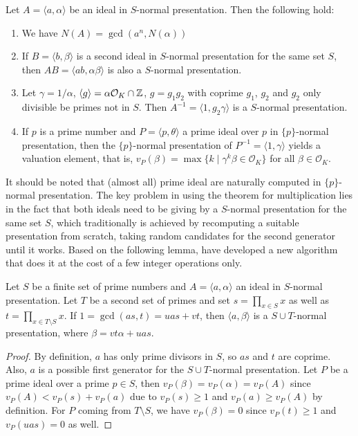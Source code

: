 \documentclass{sig-alternate-05-2015}
\begin{document}
\begin{theorem}
Let $A = \langle a, \alpha \rangle$ be an ideal in $S$-normal presentation. Then the following hold:
\begin{enumerate}
\item We have $N(A) = \gcd(a^n, N(\alpha))$
\item If $B = \langle b, \beta\rangle$ is a second ideal in $S$-normal
presentation for the same set $S$, then
$AB = \langle ab, \alpha\beta\rangle$ is also a $S$-normal presentation.
\item Let $\gamma = 1/\alpha$, $\langle g\rangle = \alpha \mathcal O_K \cap \mathbb{Z}$,
 $g = g_1g_2$ with coprime $g_1$, $g_2$ and $g_2$ only divisible be primes not in $S$. Then $A^{-1} = \langle 1, g_2\gamma\rangle$ is a $S$-normal presentation.
\item If $p$ is a prime number and $P= \langle p, \theta\rangle$ a prime ideal over $p$
in $\{p\}$-normal presentation, then the $\{p\}$-normal presentation
of $P^{-1} = \langle 1, \gamma\rangle$ yields a valuation element, that is,
$v_P(\beta) = \max\{ k \mid \gamma^k\beta\in \mathcal O_K\}$ for all $\beta \in \mathcal O_K$.
\end{enumerate}
\end{theorem}

It should be noted that (almost all) prime ideal are naturally computed
in $\{p\}$-normal presentation. The key problem in using the theorem for
multiplication lies in the fact that both ideals need to be giving by a $S$-normal presentation for
the same set $S$, which traditionally is achieved by recomputing
a suitable presentation from scratch, taking random candidates for the
second generator until it works. Based on the following lemma, have developed a new algorithm that does it at the cost 
of a few integer operations only.

\begin{lemma}
Let $S$ be a finite set of prime numbers and $A=\langle a, \alpha\rangle$ an ideal in
$S$-normal presentation. Let $T$ be a second set of primes and set
$s = \prod_{x\in S} x$ as well as $t = \prod_{x\in T\setminus S} x$. If $1 = \gcd(as, t) = uas + vt$,
then $\langle a, \beta \rangle$ is a $S\cup T$-normal presentation, where $\beta = vt\alpha + uas$.
\end{lemma}

\begin{proof}
By definition, $a$ has only prime divisors in $S$, so $as$ and $t$ are coprime.
Also, $a$ is a possible first generator for the $S\cup T$-normal presentation.
Let $P$ be a prime ideal over a prime $p\in S$, then
$v_P(\beta) = v_P(\alpha)= v_P(A)$ since $v_P(A) <v_P(s)+v_P(a)$ due to $v_P(s)\ge 1$ and $v_P(a) \ge v_P(A)$ by definition.
For $P$ coming from $T\setminus S$, we have $v_P(\beta) = 0$ since $v_P(t)\ge 1$ and $v_P(uas) = 0$ as well.
\end{proof}
\end{document}
